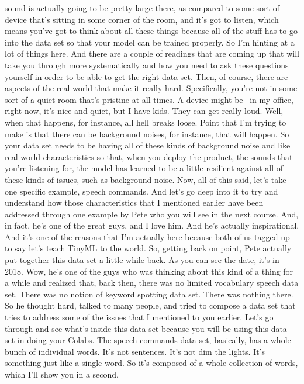 sound is actually going to be pretty large there,
as compared to some sort of device that's
sitting in some corner of the room, and it's got to listen,
which means you've got to think about all these things
because all of the stuff has to go into the data set so that your model can
be trained properly.
So I'm hinting at a lot of things here.
And there are a couple of readings that are coming up
that will take you through more systematically
and how you need to ask these questions yourself in order
to be able to get the right data set.
Then, of course, there are aspects of the real world
that make it really hard.
Specifically, you're not in some sort of a quiet room that's
pristine at all times.
A device might be-- in my office, right now, it's nice and quiet,
but I have kids.
They can get really loud.
Well, when that happens, for instance, all hell breaks loose.
Point that I'm trying to make is that there can be background noises,
for instance, that will happen.
So your data set needs to be having all of these kinds of background noise
and like real-world characteristics so that, when
you deploy the product, the sounds that you're listening for,
the model has learned to be a little resilient against all
of these kinds of issues, such as background noise.
Now, all of this said, let's take one specific example, speech commands.
And let's go deep into it to try and understand
how those characteristics that I mentioned earlier
have been addressed through one example by Pete
who you will see in the next course.
And, in fact, he's one of the great guys, and I love him.
And he's actually inspirational.
And it's one of the reasons that I'm actually here because both of us
tagged up to say let's teach TinyML to the world.
So, getting back on point, Pete actually put together
this data set a little while back.
As you can see the date, it's in 2018.
Wow, he's one of the guys who was thinking
about this kind of a thing for a while and realized that, back then, there was
no limited vocabulary speech data set.
There was no notion of keyword spotting data set.
There was nothing there.
So he thought hard, talked to many people,
and tried to compose a data set that tries to address some of the issues
that I mentioned to you earlier.
Let's go through and see what's inside this data
set because you will be using this data set in doing your Colabs.
The speech commands data set, basically, has a whole bunch of individual words.
It's not sentences.
It's not dim the lights.
It's something just like a single word.
So it's composed of a whole collection of words,
which I'll show you in a second.
